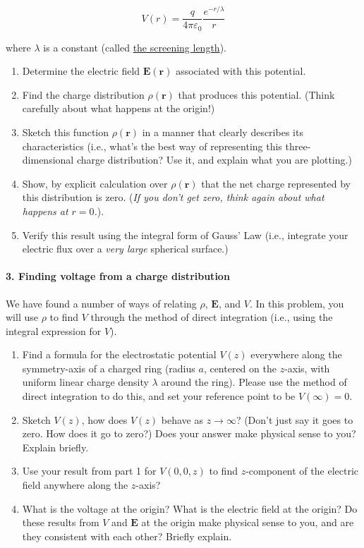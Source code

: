 \documentclass[11pt]{article}
\def\tightlist{}
\begin{document}
\[V(r) = \dfrac{q}{4\pi\varepsilon_0} \dfrac{e^{-r/\lambda}}{r}\]

where \(\lambda\) is a constant (called
\href{https://en.wikipedia.org/wiki/Debye_length}{the screening
length}).

\begin{enumerate}
\def\labelenumi{\arabic{enumi}.}
\tightlist
\item
  Determine the electric field \(\mathbf{E}(\mathbf{r})\) associated
  with this potential.
\item
  Find the charge distribution \(\rho(\mathbf{r})\) that produces this
  potential. (Think carefully about what happens at the origin!)
\item
  Sketch this function \(\rho(\mathbf{r})\) in a manner that clearly
  describes its characteristics (i.e., what's the best way of
  representing this three-dimensional charge distribution? Use it, and
  explain what you are plotting.)
\item
  Show, by explicit calculation over \(\rho(\mathbf{r})\) that the net
  charge represented by this distribution is zero. (\emph{If you don't
  get zero, think again about what happens at \(r = 0\).}).
\item
  Verify this result using the integral form of Gauss' Law (i.e.,
  integrate your electric flux over a \emph{very large} spherical
  surface.)
\end{enumerate}

\paragraph{3. Finding voltage from a charge
distribution}\label{finding-voltage-from-a-charge-distribution}

We have found a number of ways of relating \(\rho\), \(\mathbf{E}\), and
\(V\). In this problem, you will use \(\rho\) to find \(V\) through the
method of direct integration (i.e., using the integral expression for
\(V\)).

\begin{enumerate}
\def\labelenumi{\arabic{enumi}.}
\tightlist
\item
  Find a formula for the electrostatic potential \(V(z)\) everywhere
  along the symmetry-axis of a charged ring (radius \(a\), centered on
  the \(z\)-axis, with uniform linear charge density \(\lambda\) around
  the ring). Please use the method of direct integration to do this, and
  set your reference point to be \(V(\infty)=0\).\\
\item
  Sketch \(V(z)\), how does \(V(z)\) behave as \(z \rightarrow \infty\)?
  (Don't just say it goes to zero. How does it go to zero?) Does your
  answer make physical sense to you? Explain briefly.
\item
  Use your result from part 1 for \(V(0,0,z)\) to find \(z\)-component
  of the electric field anywhere along the \(z\)-axis?
\item
  What is the voltage at the origin? What is the electric field at the
  origin? Do these results from \(V\) and \(\mathbf{E}\) at the origin
  make physical sense to you, and are they consistent with each other?
  Briefly explain.
\end{enumerate}
\end{document}
